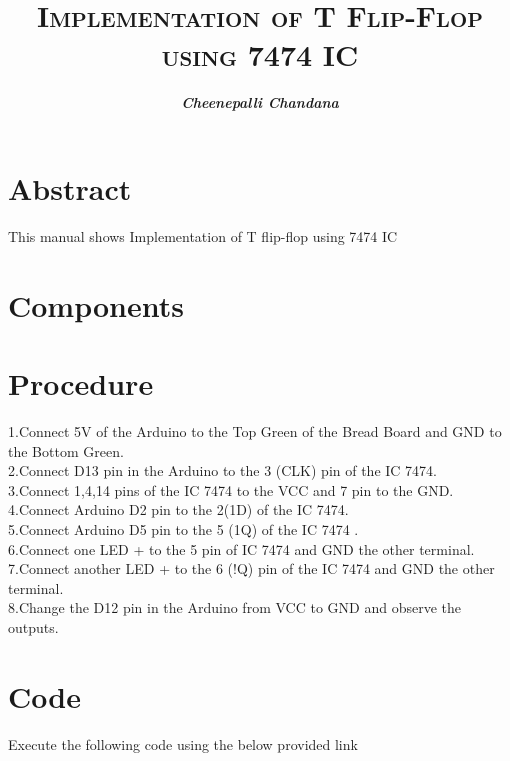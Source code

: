 \documentclass{article}
\title{\textbf{\textsc{Implementation of T Flip-Flop using 7474 IC}}}
\author{\textit{\textbf{Cheenepalli Chandana}}}
\begin{document}
\maketitle
\section{Abstract}
This manual shows Implementation of T flip-flop using 7474 IC
\section{Components}
\begin{table}[ht]
\caption{}
\label{Tabel-1}
\end{table}
\section{Procedure}
1.Connect 5V  of the Arduino to the Top Green of the Bread Board  and GND to the Bottom Green.
\\
2.Connect D13 pin in the Arduino to the 3 (CLK) pin of the IC 7474.
\\
3.Connect 1,4,14  pins of the IC 7474 to the VCC and 7 pin to the GND.
\\
4.Connect  Arduino D2 pin to the  2(1D) of the IC 7474.
\\
5.Connect Arduino D5 pin to the 5 (1Q) of the IC 7474 .
\\
6.Connect one LED + to the 5 pin of IC 7474 and GND the other terminal.
\\
7.Connect another LED +  to the 6 (!Q) pin of the IC 7474 and GND the other terminal.\\
8.Change the D12 pin in the Arduino  from VCC to GND and observe the outputs.
\\

\section{Code}
Execute the following code using the below provided link
\\
\begin{table}[ht]
\end{table}
\end{document}
